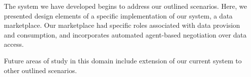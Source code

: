 \documentclass[10pt, conference, compsocconf]{IEEEtran}
\begin{document}
The system we have developed begins to address our outlined scenarios.  Here, we presented design elements of a specific implementation of our system, a data marketplace.  Our marketplace had specific roles associated with data provision and consumption, and incorporates automated agent-based negotiation over data access.

Future areas of study in this domain include extension of our current system to other outlined scenarios.









%
%
%
%



  





\end{document}
